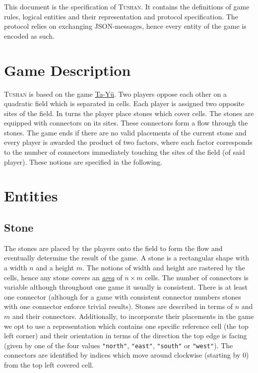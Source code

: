 \documentclass{scrartcl}
\title{\tushan{}}
\author{Voltidioten}
\newcommand{\tushan}{\textsc{Tushan}}
\begin{document}
\maketitle

This document is the specification of \tushan{}. It contains the 
definitions of game rules, logical entities and their representation and 
protocol specification. The protocol relies on exchanging JSON-messages, hence
every entity of the game is encoded as such.

\section{Game Description}
\tushan{} is based on the game 
\href{https://en.wikipedia.org/wiki/Ta\_Y\%C3\%BC}{Ta-Yü}. Two players
oppose each other on a quadratic field which is separated in cells. Each player 
is assigned two opposite sites of the field. In turns the player place stones
which cover cells. The stones are equipped with connectors on its sites. These
connectors form a flow through the stones. The game ends if there are no valid
placements of the current stone and every player is awarded the product of two
factors, where each factor corresponds to the number of connectors immediately
touching the sites of the field (of said player). These notions are specified
in the following.

\section{Entities}

\subsection{Stone}
\hypertarget{stone}{}
The stones are placed by the players onto the field to form the flow and 
eventually determine the result of the game. A stone is a rectangular shape 
with a width $n$ and a height $m$. The notions of width and height are rastered 
by the cells, hence any stone covers an \hyperlink{area}{\emph{area}} of 
$n\times m$ cells. The number of connectors is variable although throughout one 
game it usually is consistent. There is at least one connector (although for a 
game with consistent connector numbers stones with one connector enforce 
trivial results). Stones are described in terms of $n$ and $m$ and their 
connectors. Additionally, to incorporate their placements in the game we opt to 
use a representation which contains one specific reference cell (the top left 
corner) and their orientation in terms of the direction the top edge is facing 
(given by one of the four values \texttt{"north"}, 
\texttt{"east"}, \texttt{"south"} or 
\texttt{"west"}). The connectors are identified by indices which move 
around clockwise (starting by $0$) from the top left covered cell.
\end{document}
